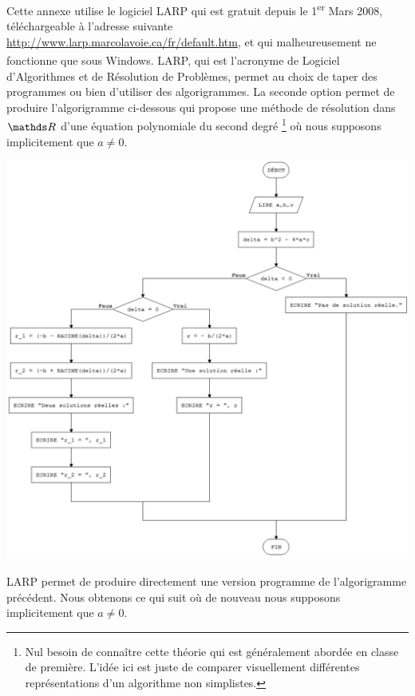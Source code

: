 Cette annexe utilise le logiciel LARP qui est gratuit depuis le 1\textsuperscript{er} Mars 2008, téléchargeable à l'adresse suivante \url{http://www.larp.marcolavoie.ca/fr/default.htm}, et qui malheureusement ne fonctionne que sous Windows\textsuperscript{\textcopyright}.
LARP, qui est l'acronyme de Logiciel d'Algorithmes et de Résolution de Problèmes, permet au choix de taper des programmes ou bien d'utiliser des algorigrammes.
La seconde option permet de produire l'algorigramme ci-dessous qui propose une méthode de résolution dans $\RR$ d'une équation polynomiale du second degré
\footnote{
    Nul besoin de connaître cette théorie qui est généralement abordée en classe de première. L'idée ici est juste de comparer \og visuellement \fg{} différentes représentations d'un algorithme non simplistes.
}
où nous supposons implicitement que $a \neq  0$.

\begin{center}
    \includegraphics[width=1\textwidth]{reading/draw_limits/real_quadratic_equations.png}
\end{center}


LARP permet de produire directement une version \og programme \fg{} de l'algorigramme précédent. Nous obtenons ce qui suit où de nouveau nous supposons implicitement que $a \neq  0$.

\newpage

